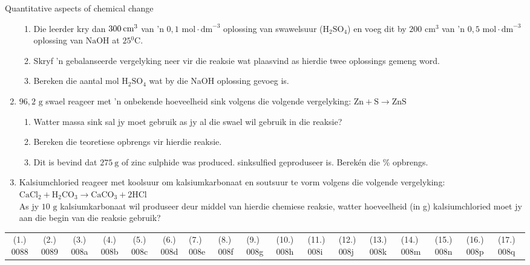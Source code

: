 \begin{eocexercises}{Quantitative aspects of chemical change}
\begin{enumerate}[noitemsep, label=\textbf{\arabic*}. ]
\begin{enumerate}[noitemsep, label=\textbf{\alph*}. ]
 \item Die leerder kry dan $300\phantom{\rule{2pt}{0ex}}{\text{cm}}^{3}$ van 'n $0,1 \text{ mol} \cdot {\text{dm}}^{-3}$ oplossing van swawelsuur ($\text{H}{}_{2}\text{SO}{}_{4}$) en voeg dit by $200 {\text{ cm}}^{3}$ van 'n $0,5 \text{ mol} \cdot {\text{dm}}^{-3}$ oplossing van $\text{NaOH}$ at $25{}^{0}\text{C}$.
 \item Skryf 'n gebalanseerde vergelyking neer vir die reaksie wat plaasvind as hierdie twee oplossings gemeng word.
 \item Bereken die aantal mol $\text{H}{}_{2}\text{SO}{}_{4}$ wat by die NaOH oplossing gevoeg is.
\end{enumerate}
\item $96,2 \text{ g}$ swael reageer met 'n onbekende hoeveelheid sink volgens die volgende vergelyking: 
$\text{Zn}+\text{S}\to \text{ZnS}$
 \begin{enumerate}[noitemsep, label=\textbf{\alph*}. ] 
 \item Watter massa sink sal jy moet gebruik as jy al die swael wil gebruik in die reaksie?
 \item Bereken die teoretiese opbrengs vir hierdie reaksie.
 \item Dit is bevind dat $275~\text{g}$ of zinc sulphide was produced. sinksulfied geproduseer is. Berekén die \% opbrengs.
 \end{enumerate}
\item Kalsiumchloried reageer met koolsuur om kalsiumkarbonaat en soutsuur te vorm volgens die volgende vergelyking:\\
${\text{CaCl}}_{2}+{\text{H}}_{2}{\text{CO}}_{3}\to {\text{CaCO}}_{3}+2\text{HCl}$\\
As jy $10 \text{ g}$ kalsiumkarbonaat wil produseer deur middel van hierdie chemiese reaksie, watter hoeveelheid (in g) kalsiumchloried moet jy aan die begin van die reaksie gebruik?
                \end{enumerate}
\practiceinfo
\par 
 \par \begin{tabular}[h]{cccccc}
 (1.) 0088  &  (2.) 0089  &  (3.) 008a  &  (4.) 008b  &  (5.) 008c  &  (6.) 008d  &  (7.) 008e  &  (8.) 008f  &  (9.) 008g  &  (10.) 008h  &  (11.) 008i  &  (12.) 008j  &  (13.) 008k  &  (14.) 008m  &  (15.) 008n  & (16.) 008p & (17.) 008q \end{tabular}
\end{eocexercises}
